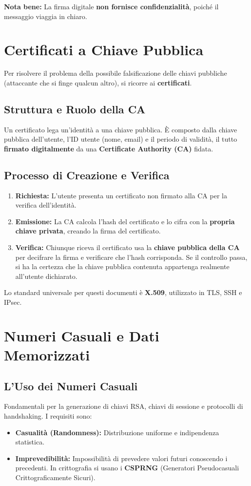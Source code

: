 \textbf{Nota bene:} La firma digitale \textbf{non fornisce confidenzialità}, poiché il messaggio viaggia in chiaro.

\section{Certificati a Chiave Pubblica}
Per risolvere il problema della possibile falsificazione delle chiavi pubbliche (attaccante che si finge qualcun altro), si ricorre ai \textbf{certificati}.

\subsection{Struttura e Ruolo della CA}
Un certificato lega un'identità a una chiave pubblica. È composto dalla chiave pubblica dell'utente, l'ID utente (nome, email) e il periodo di validità, il tutto \textbf{firmato digitalmente} da una \textbf{Certificate Authority (CA)} fidata.

\subsection{Processo di Creazione e Verifica}
\begin{enumerate}
    \item \textbf{Richiesta:} L'utente presenta un certificato non firmato alla CA per la verifica dell'identità.
    \item \textbf{Emissione:} La CA calcola l'hash del certificato e lo cifra con la \textbf{propria chiave privata}, creando la firma del certificato.
    \item \textbf{Verifica:} Chiunque riceva il certificato usa la \textbf{chiave pubblica della CA} per decifrare la firma e verificare che l'hash corrisponda. Se il controllo passa, si ha la certezza che la chiave pubblica contenuta appartenga realmente all'utente dichiarato.
\end{enumerate}

Lo standard universale per questi documenti è \textbf{X.509}, utilizzato in TLS, SSH e IPsec.


\section{Numeri Casuali e Dati Memorizzati}

\subsection{L'Uso dei Numeri Casuali}
Fondamentali per la generazione di chiavi RSA, chiavi di sessione e protocolli di handshaking. I requisiti sono:
\begin{itemize}
    \item \textbf{Casualità (Randomness):} Distribuzione uniforme e indipendenza statistica.
    \item \textbf{Imprevedibilità:} Impossibilità di prevedere valori futuri conoscendo i precedenti. In crittografia si usano i \textbf{CSPRNG} (Generatori Pseudocasuali Crittograficamente Sicuri).
\end{itemize}

